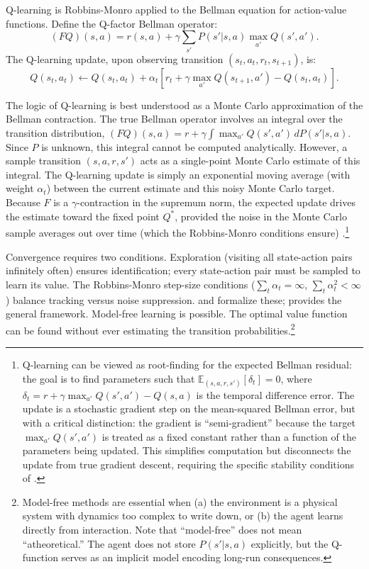 Q-learning \citep{WatkinsDayan1992} is Robbins-Monro applied to the Bellman equation for action-value functions. Define the Q-factor Bellman operator:
\begin{equation}
(FQ)(s,a) = r(s,a) + \gamma \sum_{s'} P(s'|s,a) \max_{a'} Q(s',a').
\end{equation}
The Q-learning update, upon observing transition $(s_t, a_t, r_t, s_{t+1})$, is:
\begin{equation}
Q(s_t, a_t) \leftarrow Q(s_t, a_t) + \alpha_t \left[ r_t + \gamma \max_{a'} Q(s_{t+1}, a') - Q(s_t, a_t) \right].
\label{eq:qlearning}
\end{equation}

The logic of Q-learning is best understood as a Monte Carlo approximation of the Bellman contraction. The true Bellman operator involves an integral over the transition distribution, $(FQ)(s,a) = r + \gamma \int \max_{a'} Q(s',a') \, dP(s'|s,a)$. Since $P$ is unknown, this integral cannot be computed analytically. However, a sample transition $(s,a,r,s')$ acts as a single-point Monte Carlo estimate of this integral. The Q-learning update is simply an exponential moving average (with weight $\alpha_t$) between the current estimate and this noisy Monte Carlo target. Because $F$ is a $\gamma$-contraction in the supremum norm, the expected update drives the estimate toward the fixed point $Q^*$, provided the noise in the Monte Carlo sample averages out over time (which the Robbins-Monro conditions ensure) \citep{tsitsiklis1994}.\footnote{Q-learning can be viewed as root-finding for the expected Bellman residual: the goal is to find parameters such that $\mathbb{E}_{(s,a,r,s')}[\delta_t] = 0$, where $\delta_t = r + \gamma \max_{a'} Q(s',a') - Q(s,a)$ is the temporal difference error. The update is a stochastic gradient step on the mean-squared Bellman error, but with a critical distinction: the gradient is ``semi-gradient'' because the target $\max_{a'} Q(s',a')$ is treated as a fixed constant rather than a function of the parameters being updated. This simplifies computation but disconnects the update from true gradient descent, requiring the specific stability conditions of \citet{tsitsiklis1994}.}

Convergence requires two conditions. Exploration (visiting all state-action pairs infinitely often) ensures identification; every state-action pair must be sampled to learn its value. The Robbins-Monro step-size conditions ($\sum_t \alpha_t = \infty$, $\sum_t \alpha_t^2 < \infty$) balance tracking versus noise suppression. \citet{WatkinsDayan1992} and \citet{jaakkola1994} formalize these; \citet{tsitsiklis1994} provides the general framework. Model-free learning is possible. The optimal value function can be found without ever estimating the transition probabilities.\footnote{Model-free methods are essential when (a) the environment is a physical system with dynamics too complex to write down, or (b) the agent learns directly from interaction. Note that ``model-free'' does not mean ``atheoretical.'' The agent does not store $P(s'|s,a)$ explicitly, but the Q-function serves as an implicit model encoding long-run consequences.}

